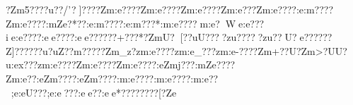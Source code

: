 {{{{{{{?Zm5????u??/'?}]????Zm:e????Zm:e????Zm:e????Zm:e???Zm:e????:e:m????Zm:e????:mZe?*??:e:m????:e:m???*:m:e????m:e?We:e???ie:e????:ee????:ee??????+???*{?ZmU?[??uU????zu?????zu??U?}e??????Z]?????}?u?uZ?}?m?????}Zm_z?zm:e????zm:e_???zm:e-????}Zm+??U?}Zm>?UU?u:ex???zm:e????Zm:e????Zm:e????:eZmj???:mZe????Zm:e??:eZm????:eZm????:m:e????:m:e????:m:e??;e:eU???;e:e???:ee??:ee*????}?\????[?Ze%
